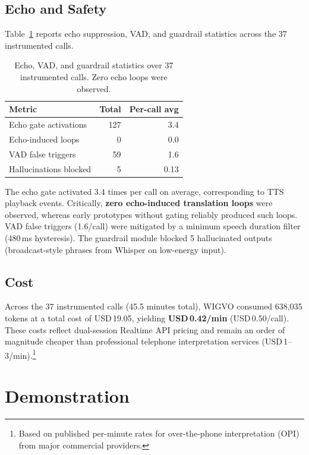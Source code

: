 \documentclass[11pt]{article}
\begin{document}
\subsection{Echo and Safety}

Table~\ref{tab:safety} reports echo suppression, VAD, and guardrail statistics across the 37 instrumented calls.

\begin{table}[t]
  \centering
  \small
  \begin{tabular}{lrr}
    \toprule
    \textbf{Metric} & \textbf{Total} & \textbf{Per-call avg} \\
    \midrule
    Echo gate activations & 127 & 3.4 \\
    Echo-induced loops & 0 & 0.0 \\
    VAD false triggers & 59 & 1.6 \\
    Hallucinations blocked & 5 & 0.13 \\
    \bottomrule
  \end{tabular}
  \caption{Echo, VAD, and guardrail statistics over 37 instrumented calls. Zero echo loops were observed.}
  \label{tab:safety}
\end{table}

The echo gate activated 3.4 times per call on average, corresponding to TTS playback events. Critically, \textbf{zero echo-induced translation loops} were observed, whereas early prototypes without gating reliably produced such loops. VAD false triggers (1.6/call) were mitigated by a minimum speech duration filter (480\,ms hysteresis). The guardrail module blocked 5 hallucinated outputs (broadcast-style phrases from Whisper on low-energy input).


\subsection{Cost}

Across the 37 instrumented calls (45.5 minutes total), WIGVO consumed 638{,}035 tokens at a total cost of USD\,19.05, yielding \textbf{USD\,0.42/min} (USD\,0.50/call). These costs reflect dual-session Realtime API pricing and remain an order of magnitude cheaper than professional telephone interpretation services (USD\,1--3/min).\footnote{Based on published per-minute rates for over-the-phone interpretation (OPI) from major commercial providers.}

\section{Demonstration}
\end{document}

